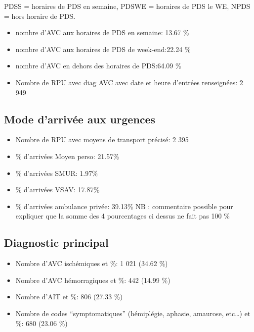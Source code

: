 \documentclass[]{article}
\begin{document}
PDSS = horaires de PDS en semaine, PDSWE = horaires de PDS le WE, NPDS =
hors horaire de PDS.

\begin{itemize}
\itemsep1pt\parskip0pt
\item
  nombre d'AVC aux horaires de PDS en semaine: 13.67 \%
\item
  nombre d'AVC aux horaires de PDS de week-end:22.24 \%
\item
  nombre d'AVC en dehors des horaires de PDS:64.09 \%
\item
  Nombre de RPU avec diag AVC avec date et heure d'entrées renseignées:
  2 949
\end{itemize}

\subsection{Mode d'arrivée aux
urgences}\label{mode-darrivee-aux-urgences}

\begin{itemize}
\itemsep1pt\parskip0pt
\item
  Nombre de RPU avec moyens de transport précisé: 2 395
\item
  \% d'arrivées Moyen perso: 21.57\%
\item
  \% d'arrivées SMUR: 1.97\%
\item
  \% d'arrivées VSAV: 17.87\%
\item
  \% d'arrivées ambulance privée: 39.13\% NB : commentaire possible pour
  expliquer que la somme des 4 pourcentages ci dessus ne fait pas 100 \%
\end{itemize}

\subsection{Diagnostic principal}\label{diagnostic-principal-2}

\begin{itemize}
\itemsep1pt\parskip0pt
\item
  Nombre d'AVC ischémiques et \%: 1 021 (34.62 \%)
\item
  Nombre d'AVC hémorragiques et \%: 442 (14.99 \%)
\item
  Nombre d'AIT et \%: 806 (27.33 \%)
\item
  Nombre de codes ``symptomatiques'' (hémiplégie, aphasie, amaurose,
  etc\ldots{}) et \%: 680 (23.06 \%)
\end{itemize}
\end{document}
